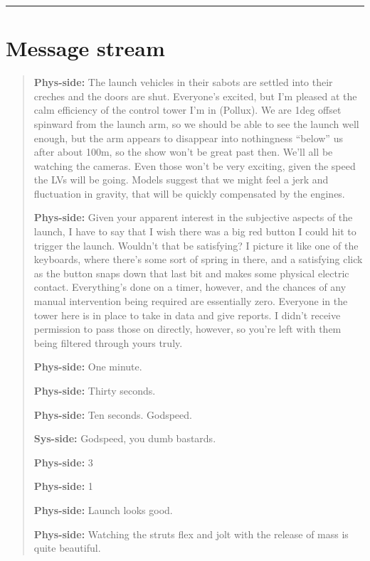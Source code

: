 \begin{center}\rule{0.5\linewidth}{0.5pt}\end{center}

\hypertarget{message-stream}{%
\section*{Message stream}\label{message-stream}}

\begin{quote}
\textbf{Phys-side:} The launch vehicles in their sabots are settled into their creches and the doors are shut. Everyone's excited, but I'm pleased at the calm efficiency of the control tower I'm in (Pollux). We are 1deg offset spinward from the launch arm, so we should be able to see the launch well enough, but the arm appears to disappear into nothingness ``below'' us after about 100m, so the show won't be great past then. We'll all be watching the cameras. Even those won't be very exciting, given the speed the LVs will be going. Models suggest that we might feel a jerk and fluctuation in gravity, that will be quickly compensated by the engines.

\textbf{Phys-side:} Given your apparent interest in the subjective aspects of the launch, I have to say that I wish there was a big red button I could hit to trigger the launch. Wouldn't that be satisfying? I picture it like one of the keyboards, where there's some sort of spring in there, and a satisfying click as the button snaps down that last bit and makes some physical electric contact. Everything's done on a timer, however, and the chances of any manual intervention being required are essentially zero. Everyone in the tower here is in place to take in data and give reports. I didn't receive permission to pass those on directly, however, so you're left with them being filtered through yours truly.

\textbf{Phys-side:} One minute.

\textbf{Phys-side:} Thirty seconds.

\textbf{Phys-side:} Ten seconds. Godspeed.

\textbf{Sys-side:} Godspeed, you dumb bastards.

\textbf{Phys-side:} 3

\textbf{Phys-side:} 1

\textbf{Phys-side:} Launch looks good.

\textbf{Phys-side:} Watching the struts flex and jolt with the release of mass is quite beautiful.


\end{quote}
